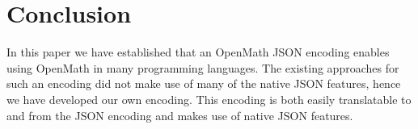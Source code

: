 \section{Conclusion}

In this paper we have established that an OpenMath JSON encoding enables using OpenMath in many programming languages. 
The existing approaches for such an encoding did not make use of many of the native JSON features, hence we have developed our own encoding. 
This encoding is both easily translatable to and from the JSON encoding and makes use of native JSON features. 

